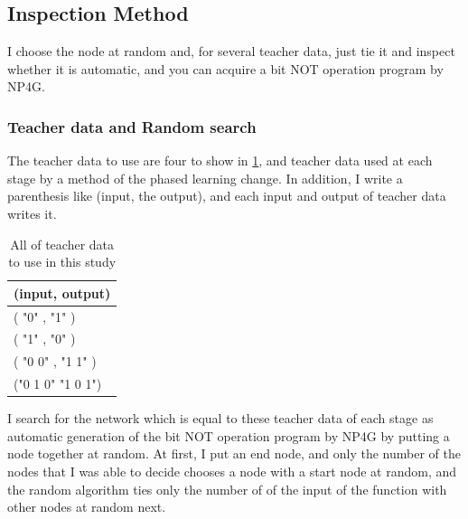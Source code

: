 \documentclass{article}
\begin{document}
\subsection {Inspection Method}
I choose the node at random and, for several teacher data, just tie it and inspect whether it is automatic, and you can acquire a bit NOT operation program by NP4G.
\subsubsection {Teacher data and Random search}
The teacher data to use are four to show in \ref{tbl:TeacherData}, and teacher data used at each stage by a method of the phased learning change.
In addition, I write a parenthesis like (input, the output), and each input and output of teacher data writes it.
\begin{table}[htbp]
\centering
\caption {All of teacher data to use in this study}
\label{tbl:TeacherData}
\begin{tabular}{l}
\hline
(input, output) \\
\hline \hline
( "0" , "1" ) \\
( "1" , "0" ) \\
( "0 0" , "1 1" ) \\
("0 1 0" "1 0 1") \\
\hline
\end{tabular}
\end{table}
I search for the network which is equal to these teacher data of each stage as automatic generation of the bit NOT operation program by NP4G by putting a node together at random.
At first, I put an end node, and only the number of the nodes that I was able to decide chooses a node with a start node at random, and the random algorithm ties only the number of of the input of the function with other nodes at random next.
\end{document}
